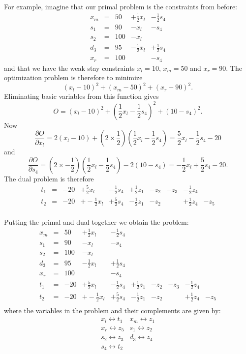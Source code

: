 \documentclass{article}
\begin{document}
For example, imagine that our primal problem is the constraints from before:
\[
\begin{array}{rlrrr}
x_m & = &50 & + \frac{1}{2} x_l & - \frac{1}{2} s_4 \\
s_1 & = &90 & - x_l &  - s_4 \\
s_2 & = &100 & - x_l \\
d_3 & = &95 & - \frac{1}{2} x_l & + \frac{1}{2} s_4 \\
x_r & = &100 &  & - s_4
\end{array}
\]
and that we have the weak stay
constraints  $x_l = 10$, $x_m= 50$ and $x_r = 90$.
The optimization problem is therefore to minimize
\[
(x_l - 10)^2 + (x_m - 50)^2 + (x_r - 90)^2.
\]
Eliminating basic variables from this function gives
\[
O = (x_l - 10)^2 + (\frac{1}{2} x_l  - \frac{1}{2} s_4)^2
 + (10 -s_4)^2.
\]
Now
\[
\frac{ \partial O}{\partial x_l} = 2 (x_l - 10) +
 (2 \times \frac{1}{2}) (\frac{1}{2} x_l  - \frac{1}{2} s_4)
= \frac{5}{2} x_l  - \frac{1}{2} s_4 - 20
\]
and
\[
\frac{ \partial O}{\partial s_4} =
 (2 \times - \frac{1}{2}) (\frac{1}{2} x_l  - \frac{1}{2} s_4)
 - 2 (10 -s_4)
= - \frac{1}{2} x_l  + \frac{5}{2} s_4 - 20.
\]
The dual problem is therefore
\[
\begin{array}{rlrrrrrrrr}
t_1 & = &-20 & + \frac{5}{2} x_l & - \frac{1}{2} s_4 &
        + \frac{1}{2} z_1 & - z_2 & - z_3 & - \frac{1}{2} z_4 & \\
t_2 & = &-20 & + - \frac{1}{2} x_l & + \frac{5}{2} s_4 &
        - \frac{1}{2} z_1 & - z_2 &  & + \frac{1}{2} z_4 & -z_5  \\
\end{array}
\]

Putting the primal and dual together we obtain the problem:
\[
\begin{array}{rlrrrrrrrr}
x_m & = &50 & + \frac{1}{2} x_l & - \frac{1}{2} s_4 \\
s_1 & = &90 & - x_l &  - s_4 \\
s_2 & = &100 & - x_l \\
d_3 & = &95 & - \frac{1}{2} x_l & + \frac{1}{2} s_4 \\
x_r & = &100 &  & - s_4\\
t_1 & = &-20 & + \frac{5}{2} x_l & - \frac{1}{2} s_4 &
        + \frac{1}{2} z_1 & - z_2 & - z_3 & - \frac{1}{2} z_4 & \\
t_2 & = &-20 & + - \frac{1}{2} x_l & + \frac{5}{2} s_4 &
        - \frac{1}{2} z_1 & - z_2 &  & + \frac{1}{2} z_4 & -z_5  \\
\end{array}
\]
where the variables in the problem and their complements are given by:
\[
\begin{array}{cc}
x_l \leftrightarrow t_1 & x_m \leftrightarrow z_1 \\
x_r \leftrightarrow z_5 & s_1 \leftrightarrow z_2 \\
s_2 \leftrightarrow z_3 & d_3 \leftrightarrow z_4 \\
s_4 \leftrightarrow t_2 &  \\
\end{array}
\]
\end{document}
